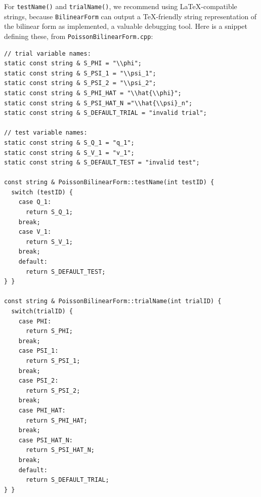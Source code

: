 For \verb=testName()= and \verb=trialName()=, we recommend using LaTeX-compatible strings, because \verb=BilinearForm= can output a TeX-friendly string representation of the bilinear form as implemented, a valuable debugging tool.  Here is a snippet defining these, from \verb=PoissonBilinearForm.cpp=:
\begin{lstlisting}
// trial variable names:
static const string & S_PHI = "\\phi";
static const string & S_PSI_1 = "\\psi_1";
static const string & S_PSI_2 = "\\psi_2";
static const string & S_PHI_HAT = "\\hat{\\phi}";
static const string & S_PSI_HAT_N ="\\hat{\\psi}_n";
static const string & S_DEFAULT_TRIAL = "invalid trial";

// test variable names:
static const string & S_Q_1 = "q_1";
static const string & S_V_1 = "v_1";
static const string & S_DEFAULT_TEST = "invalid test";

const string & PoissonBilinearForm::testName(int testID) {
  switch (testID) {
    case Q_1:
      return S_Q_1;
    break;
    case V_1:
      return S_V_1;
    break;
    default:
      return S_DEFAULT_TEST;
} }

const string & PoissonBilinearForm::trialName(int trialID) {
  switch(trialID) {
    case PHI:
      return S_PHI;
    break;
    case PSI_1:
      return S_PSI_1;
    break;
    case PSI_2:
      return S_PSI_2;
    break;
    case PHI_HAT:
      return S_PHI_HAT;
    break;
    case PSI_HAT_N:
      return S_PSI_HAT_N;
    break;
    default:
      return S_DEFAULT_TRIAL;
} }
\end{lstlisting}

